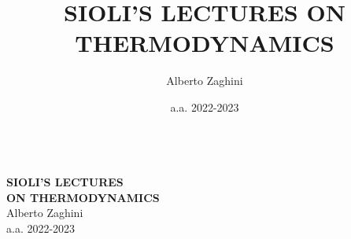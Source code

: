 \documentclass[10pt, oneside]{book}
\title{SIOLI'S LECTURES ON THERMODYNAMICS}
\author{Alberto Zaghini}
\date{a.a. 2022-2023}
\begin{document}
\makeatletter
\begin{titlepage}
\vspace{-2.1cm}
\hspace{0cm}
\vfill
\, \\\larger[20]\textsf{\textbf{SIOLI'S LECTURES \\ON THERMODYNAMICS}}
\\\smaller[2]Alberto Zaghini
\\a.a. 2022-2023
\\~\\ \larger[20]\,\,
\\~\\ \,\,

\vfill
\hspace{0cm}
\end{titlepage}
\makeatother
\end{document}
